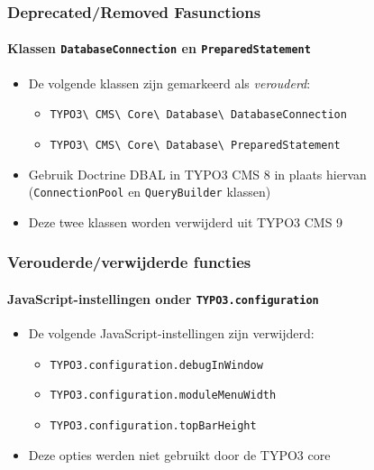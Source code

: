 \begin{frame}[fragile]
	\frametitle{Deprecated/Removed Fasunctions}
	\framesubtitle{Klassen \texttt{DatabaseConnection} en \texttt{PreparedStatement}}

	\begin{itemize}
		\item De volgende klassen zijn gemarkeerd als \textit{verouderd}:
			\begin{itemize}
				\item \texttt{TYPO3\textbackslash
						CMS\textbackslash
						Core\textbackslash
						Database\textbackslash
						DatabaseConnection}
				\item \texttt{TYPO3\textbackslash
						CMS\textbackslash
						Core\textbackslash
						Database\textbackslash
						PreparedStatement}
			\end{itemize}
		\item Gebruik Doctrine DBAL in TYPO3 CMS 8 in plaats hiervan\newline
				(\texttt{ConnectionPool} en \texttt{QueryBuilder} klassen)
		\item Deze twee klassen worden verwijderd uit TYPO3 CMS 9
	\end{itemize}

\end{frame}


\begin{frame}[fragile]
	\frametitle{Verouderde/verwijderde functies}
	\framesubtitle{JavaScript-instellingen onder \texttt{TYPO3.configuration}}

	\begin{itemize}
		\item De volgende JavaScript-instellingen zijn verwijderd:

		\begin{itemize}
			\item \texttt{TYPO3.configuration.debugInWindow}
			\item \texttt{TYPO3.configuration.moduleMenuWidth}
			\item \texttt{TYPO3.configuration.topBarHeight}
		\end{itemize}

		\item Deze opties werden niet gebruikt door de TYPO3 core

	\end{itemize}

\end{frame}


